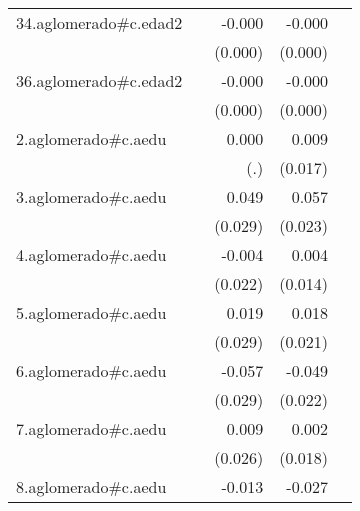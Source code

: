 {\begin{longtable}{l*{4}{D{.}{.}{-1}}}
\addlinespace
34.aglomerado#c.edad2&                     &      -0.000         &      -0.000\sym{*}  &                     \\
            &                     &     (0.000)         &     (0.000)         &                     \\
\addlinespace
36.aglomerado#c.edad2&                     &      -0.000         &      -0.000         &                     \\
            &                     &     (0.000)         &     (0.000)         &                     \\
\addlinespace
2.aglomerado#c.aedu&                     &       0.000         &       0.009         &                     \\
            &                     &         (.)         &     (0.017)         &                     \\
\addlinespace
3.aglomerado#c.aedu&                     &       0.049         &       0.057\sym{*}  &                     \\
            &                     &     (0.029)         &     (0.023)         &                     \\
\addlinespace
4.aglomerado#c.aedu&                     &      -0.004         &       0.004         &                     \\
            &                     &     (0.022)         &     (0.014)         &                     \\
\addlinespace
5.aglomerado#c.aedu&                     &       0.019         &       0.018         &                     \\
            &                     &     (0.029)         &     (0.021)         &                     \\
\addlinespace
6.aglomerado#c.aedu&                     &      -0.057\sym{*}  &      -0.049\sym{*}  &                     \\
            &                     &     (0.029)         &     (0.022)         &                     \\
\addlinespace
7.aglomerado#c.aedu&                     &       0.009         &       0.002         &                     \\
            &                     &     (0.026)         &     (0.018)         &                     \\
\addlinespace
8.aglomerado#c.aedu&                     &      -0.013         &      -0.027         &                     \\

\end{longtable}}
